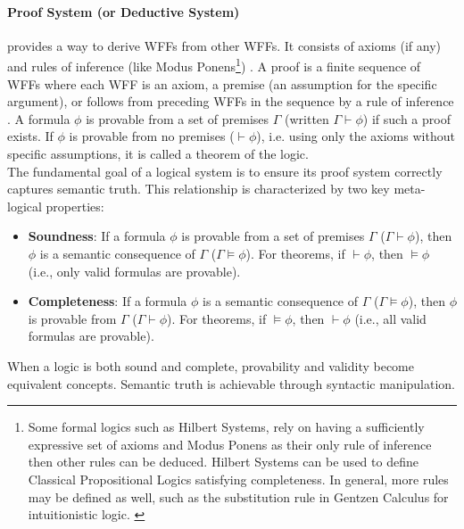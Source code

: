 \paragraph{Proof System (or Deductive System)} provides a way to derive WFFs from other WFFs. It consists of axioms (if any) and rules of inference (like Modus Ponens\footnote{Some formal logics such as Hilbert Systems, rely on having a sufficiently expressive set of axioms and Modus Ponens as their only rule of inference then other rules can be deduced\cite[Sec.~1.2, Def.~1.2.6]{Hajek1998}. Hilbert Systems can be used to define Classical Propositional Logics satisfying completeness. In general, more rules may be defined as well, such as the substitution rule in Gentzen Calculus for intuitionistic logic. \cite[p.~39,64]{ResiduatedLattices2007}}) \cite[Sec.~5.1, 5.3]{Agler2013SymbolicLogic}. A proof is a finite sequence of WFFs where each WFF is an axiom, a premise (an assumption for the specific argument), or follows from preceding WFFs in the sequence by a rule of inference \cite[Sec.~5.1]{Agler2013SymbolicLogic}. A formula $\phi$ is provable from a set of premises $\Gamma$ (written $\Gamma \vdash \phi$) if such a proof exists. If $\phi$ is provable from no premises ($\vdash \phi$), i.e. using only the axioms without specific assumptions, it is called a theorem of the logic.\\

The fundamental goal of a logical system is to ensure its proof system correctly captures semantic truth. This relationship is characterized by two key meta-logical properties:
\begin{itemize}
    \item \textbf{Soundness}: If a formula $\phi$ is provable from a set of premises $\Gamma$ ($\Gamma \vdash \phi$), then $\phi$ is a semantic consequence of $\Gamma$ ($\Gamma \models \phi$). For theorems, if $\vdash \phi$, then $\models \phi$ (i.e., only valid formulas are provable).\cite[Lemma~1.2.7]{Hajek1998}
    \item \textbf{Completeness}: If a formula $\phi$ is a semantic consequence of $\Gamma$ ($\Gamma \models \phi$), then $\phi$ is provable from $\Gamma$ ($\Gamma \vdash \phi$). For theorems, if $\models \phi$, then $\vdash \phi$ (i.e., all valid formulas are provable).\cite[Lemma~1.2.9]{Hajek1998}
\end{itemize}
When a logic is both sound and complete, provability and validity become equivalent concepts. Semantic truth is achievable through syntactic manipulation.\cite[Thm.~1.2.11]{Hajek1998}

